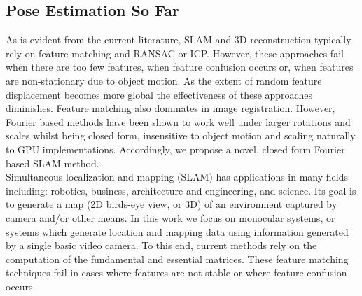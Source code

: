 \subsection{Pose Estimation So Far}

As is evident from the current literature, SLAM and 3D reconstruction typically rely on feature matching and RANSAC or ICP. However, these approaches fail when there are too few features, when feature confusion occurs or, when features are non-stationary due to object motion. As the extent of random feature displacement becomes more global the effectiveness of these approaches diminishes. Feature matching also dominates in image registration. However, Fourier based methods have been shown to work well under larger rotations and scales \cite{Gonzalez11Improving} whilst being closed form, insensitive to object motion and scaling naturally to GPU implementations. Accordingly, we propose a novel, closed form Fourier based SLAM method. \\

Simultaneous localization and mapping (SLAM) has applications in many fields including: robotics, business, architecture and engineering, and science. Its goal is to generate a map (2D birds-eye view, or 3D) of an environment captured by camera and/or other means. In this work we focus on monocular systems, or systems which generate location and mapping data using information generated by a single basic video camera. To this end, current methods rely on the computation of the fundamental and essential matrices. These feature matching techniques fail in cases where features are not stable or where feature confusion occurs. 




